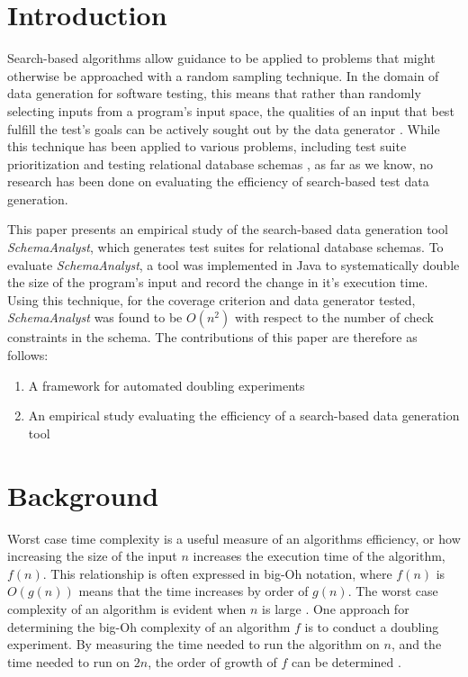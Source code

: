 \documentclass[smallextended]{svjour3}       %
\begin{document}
\section{Introduction}
Search-based algorithms allow guidance to be applied to problems that
might otherwise be approached with a random sampling technique. In the
domain of data generation for software testing, this means that rather
than randomly selecting inputs from a program's input space, the
qualities of an input that best fulfill the test's goals can be
actively sought out by the data generator \cite{McMinn:Thesis}. While this
technique has been applied to various problems, including test suite
prioritization \cite{Walcott:tsp} and testing
relational database schemas \cite{Kapfhammer2013}, 
as far as we know, no research has been done on evaluating the efficiency
of search-based test data generation. 

This paper presents an empirical study of the search-based data
generation tool \textit{SchemaAnalyst}, which generates test suites for
relational database schemas.  To evaluate \textit{SchemaAnalyst}, a tool
was implemented in Java to systematically double the size of the
program's input and record the change in it's execution time. Using this
technique, for the coverage criterion and data generator tested, 
\textit{SchemaAnalyst} was found to be $O(n^2)$ with respect
to the number of check constraints in the schema. The contributions of
this paper are therefore as follows:
\begin{enumerate}
  \item A framework for automated doubling experiments
  \item An empirical study evaluating the efficiency of a search-based
    data generation tool
  \end{enumerate}

\section{Background}

Worst case time complexity is a useful measure of an algorithms
efficiency, or how increasing the size
of the input $n$ increases the execution time of the algorithm, $f(n)$.
This relationship is often expressed in big-Oh notation, where $f(n)$
is $O(g(n))$ means that the time increases by order of $g(n)$. The worst
case complexity of an algorithm is evident when $n$ is large 
\cite{Goodrich:Data}. One approach for determining the big-Oh complexity
of an algorithm $f$ is to conduct a doubling experiment. By measuring the
time needed to run the algorithm on $n$, and the time needed to run on $2n$, the order of growth
of $f$ can be determined \cite{Mcgeoch:Algorithmics,
Sedgewick:Analysis}. 
\end{document}
